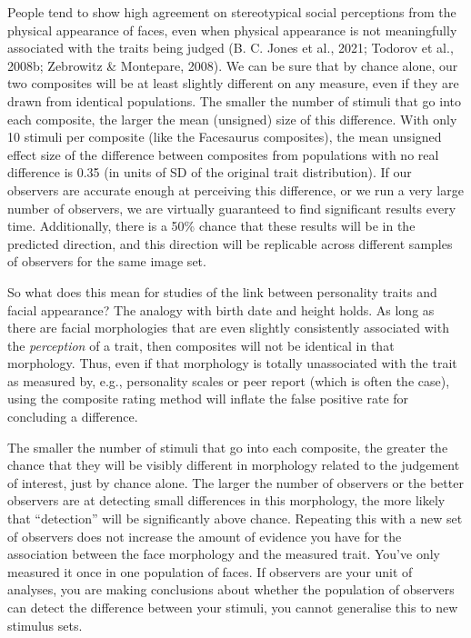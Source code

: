 \documentclass[
  doc,floatsintext]{apa6}
\begin{document}
People tend to show high agreement on stereotypical social perceptions from the physical appearance of faces, even when physical appearance is not meaningfully associated with the traits being judged (B. C. Jones et al., 2021; Todorov et al., 2008b; Zebrowitz \& Montepare, 2008). We can be sure that by chance alone, our two composites will be at least slightly different on any measure, even if they are drawn from identical populations. The smaller the number of stimuli that go into each composite, the larger the mean (unsigned) size of this difference. With only 10 stimuli per composite (like the Facesaurus composites), the mean unsigned effect size of the difference between composites from populations with no real difference is 0.35 (in units of SD of the original trait distribution). If our observers are accurate enough at perceiving this difference, or we run a very large number of observers, we are virtually guaranteed to find significant results every time. Additionally, there is a 50\% chance that these results will be in the predicted direction, and this direction will be replicable across different samples of observers for the same image set.

So what does this mean for studies of the link between personality traits and facial appearance? The analogy with birth date and height holds. As long as there are facial morphologies that are even slightly consistently associated with the \emph{perception} of a trait, then composites will not be identical in that morphology. Thus, even if that morphology is totally unassociated with the trait as measured by, e.g., personality scales or peer report (which is often the case), using the composite rating method will inflate the false positive rate for concluding a difference.

The smaller the number of stimuli that go into each composite, the greater the chance that they will be visibly different in morphology related to the judgement of interest, just by chance alone. The larger the number of observers or the better observers are at detecting small differences in this morphology, the more likely that ``detection'' will be significantly above chance. Repeating this with a new set of observers does not increase the amount of evidence you have for the association between the face morphology and the measured trait. You've only measured it once in one population of faces. If observers are your unit of analyses, you are making conclusions about whether the population of observers can detect the difference between your stimuli, you cannot generalise this to new stimulus sets.
\end{document}
